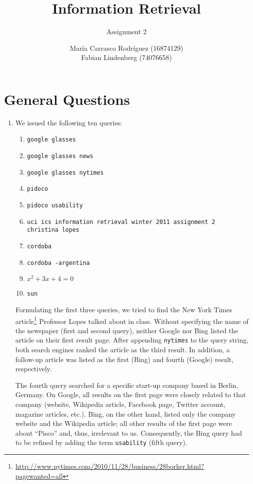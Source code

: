 \documentclass[a4paper,11pt,oneside]{book}
\title{Information Retrieval }
\subtitle{Assignment 2}
\author{ María Carrasco Rodríguez (16874129) \\
		Fabian Lindenberg (74076658)}
\begin{document}
\kostspieligmaketitle

\tableofcontents
\pagebreak

\chapter{General Questions}

\begin{enumerate}\item We issued the following ten queries:
				\begin{enumerate}
					\renewcommand{\labelenumii}{\Roman{enumii}}
					\item \texttt{google glasses}
					\item \texttt{google glasses news}
					\item \texttt{google glasses nytimes}
					\item \texttt{pidoco}
					\item \texttt{pidoco usability}
					\item \texttt{uci ics information retrieval winter 2011 assignment 2 christina lopes}
					\item \texttt{cordoba}
					\item \texttt{cordoba -argentina}
					\item $x^2 + 3x + 4 = 0$
					\item \texttt{sun}
				\end{enumerate}
				Formulating the first three queries, we tried to find the New York Times article\footnote{\url{http://www.nytimes.com/2010/11/28/business/28borker.html?pagewanted=all}} Professor Lopes talked about in class. Without specifying the name of the newspaper (first and second query), neither Google nor Bing listed the article on their first result page. After appending \texttt{nytimes} to the query string, both search engines ranked the article as the third result. In addition, a follow-up article was listed as the first (Bing) and fourth (Google) result, respectively.
				
				The fourth query searched for a specific start-up company based in Berlin, Germany. On Google, all results on the first page were closely related to that company (website, Wikipedia article, Facebook page, Twitter account, magazine articles, etc.). Bing, on the other hand, listed only the company website and the Wikipedia article; all other results of the first page were about ``Pisco'' and, thus, irrelevant to us. Consequently, the Bing query had to be refined by adding the term \texttt{usability} (fifth query).
				

\end{enumerate}
\end{document}
